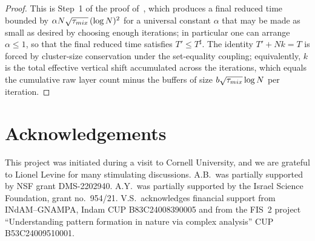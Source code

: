 \documentclass[11pt,a4paper,reqno]{amsart}
\theoremstyle{definition}
\begin{document}
\begin{proof}
This is Step~1 of the proof of~\cite[Theorem~4]{silvestri2020internal}, which produces  a final reduced time bounded by $\alpha N\sqrt{\tau_{mix}}\,(\log N)^2$ for a universal constant $\alpha$ that may be made as small as desired by choosing enough iterations; in particular one can arrange $\alpha \leq 1$, so that the final reduced time satisfies $T' \leq T^\sharp$. The identity $T' + Nk = T$ is forced by cluster-size conservation under the set-equality coupling; equivalently, $k$ is the total effective vertical shift accumulated across the iterations, which equals the cumulative raw layer count minus the buffers of size $b\sqrt{\tau_{mix}}\log N$ per iteration.
\end{proof}


\section*{Acknowledgements}
This project was initiated during a visit to Cornell University, and we are grateful to Lionel Levine for many stimulating discussions. A.B.\ was partially supported by NSF grant DMS-2202940. A.Y.\ was partially supported by the Israel Science Foundation, grant no.\ 954/21. V.S.\ acknowledges financial support from INdAM--GNAMPA, Indam  CUP B83C24008390005 and from the FIS~2 project ``Understanding pattern formation in nature via complex analysis'' CUP B53C24009510001. 

\medskip



\vfill 
\end{document}
